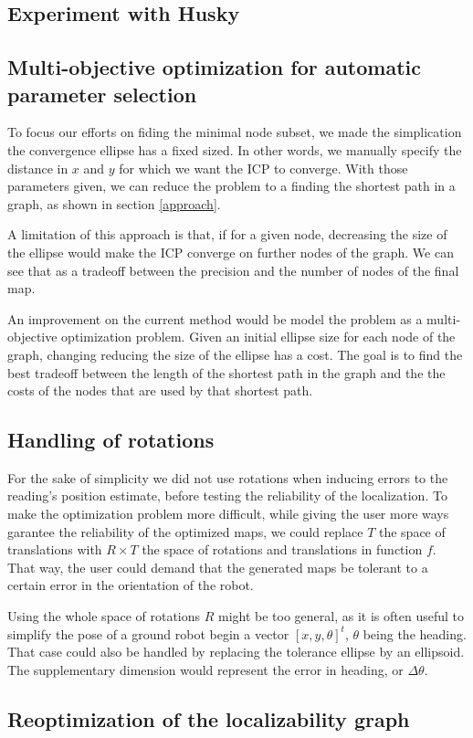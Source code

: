 \documentclass[letterpaper,10 pt,conference]{ieeeconf}
\begin{document}
\subsection{Experiment with Husky}

\subsection{Multi-objective optimization for automatic parameter selection}

To focus our efforts on fiding the minimal node subset, we made the simplication the convergence ellipse has a fixed sized.
In other words, we manually specify the distance in $x$ and $y$ for which we want the ICP to converge. With those parameters given,
we can reduce the problem to a finding the shortest path in a graph, as shown in section \ref{approach}.


A limitation of this approach is that, if for a given node, decreasing the size of the ellipse would make the ICP
converge on further nodes of the graph. We can see that as a tradeoff between the precision and the number of nodes of the final map.


An improvement on the current method would be model the problem as a multi-objective optimization problem. Given an initial
ellipse size for each node of the graph, changing reducing the size of the ellipse has a cost. The goal is to find the best
tradeoff between the length of the shortest path in the graph and the the costs of the nodes that are used by that shortest path.

\subsection{Handling of rotations}

For the sake of simplicity we did not use rotations when inducing errors to the reading's
position estimate, before testing the reliability of the localization. To make the optimization
problem more difficult, while giving the user more ways garantee the reliability of the optimized
maps, we could replace $T$ the space of translations with $R \times T$ the space of rotations and
translations in function $f$. That way, the user could demand that the generated maps be tolerant to
a certain error in the orientation of the robot.

Using the whole space of rotations $R$ might be too general, as it is often useful to simplify the pose of a
ground robot begin a vector $[x, y, \theta]^t$, $\theta$ being the heading. That case could also be
handled by replacing the tolerance ellipse by an ellipsoid. The supplementary dimension would
represent the error in heading, or $\Delta \theta$.

\subsection{Reoptimization of the localizability graph}
\end{document}
